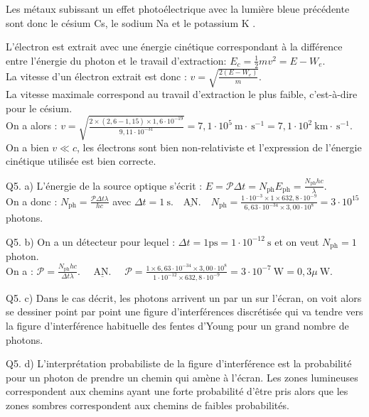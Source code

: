 \documentclass[10pt]{article}
\begin{document}
Les métaux subissant un effet photoélectrique avec la lumière bleue précédente sont donc le césium Cs, le sodium Na et le potassium K .

L'électron est extrait avec une énergie cinétique correspondant à la différence entre l'énergie du photon et le travail d'extraction: \(E_{c}=\frac{1}{2} m v^{2}=E-W_{e}\).\\
La vitesse d'un électron extrait est donc : \(v=\sqrt{\frac{2\left(E-W_{e}\right)}{m}}\).\\
La vitesse maximale correspond au travail d'extraction le plus faible, c'est-à-dire pour le césium.\\
On a alors : \(v=\sqrt{\frac{2 \times(2,6-1,15) \times 1,6 \cdot 10^{-19}}{9,11 \cdot 10^{-31}}}=7,1 \cdot 10^{5} \mathrm{~m} \cdot \mathrm{~s}^{-1}=7,1 \cdot 10^{2} \mathrm{~km} \cdot \mathrm{~s}^{-1}\).\\
On a bien \(v \ll c\), les électrons sont bien non-relativiste et l'expression de l'énergie cinétique utilisée est bien correcte.

Q5. a) L'énergie de la source optique s'écrit : \(E=\mathcal{P} \Delta t=N_{\mathrm{ph}} E_{\mathrm{ph}}=\frac{N_{\mathrm{ph}} h c}{\lambda}\).\\
On a donc : \(N_{\mathrm{ph}}=\frac{\mathcal{P} \Delta t \lambda}{h c}\) avec \(\Delta t=1 \mathrm{~s} . \quad \underline{\mathrm{AN}} . \quad N_{\mathrm{ph}}=\frac{1 \cdot 10^{-3} \times 1 \times 632,8 \cdot 10^{-9}}{6,63 \cdot 10^{-34} \times 3,00 \cdot 10^{8}}=3 \cdot 10^{15}\) photons.

Q5. b) On a un détecteur pour lequel : \(\Delta t=1 \mathrm{ps}=1 \cdot 10^{-12} \mathrm{~s}\) et on veut \(N_{\mathrm{ph}}=1\) photon.\\
On a : \(\mathcal{P}=\frac{N_{\mathrm{ph}} h c}{\Delta t \lambda} . \quad \underline{\text { AN. }} \quad \mathcal{P}=\frac{1 \times 6,63 \cdot 10^{-34} \times 3,00 \cdot 10^{8}}{1 \cdot 10^{-12} \times 632,8 \cdot 10^{-9}}=3 \cdot 10^{-7} \mathrm{~W}=0,3 \mu \mathrm{~W}\).

Q5. c) Dans le cas décrit, les photons arrivent un par un sur l'écran, on voit alors se dessiner point par point une figure d'interférences discrétisée qui va tendre vers la figure d'interférence habituelle des fentes d'Young pour un grand nombre de photons.

Q5. d) L'interprétation probabiliste de la figure d'interférence est la probabilité pour un photon de prendre un chemin qui amène à l'écran. Les zones lumineuses correspondent aux chemins ayant une forte probabilité d'être pris alors que les zones sombres correspondent aux chemins de faibles probabilités.
\end{document}
